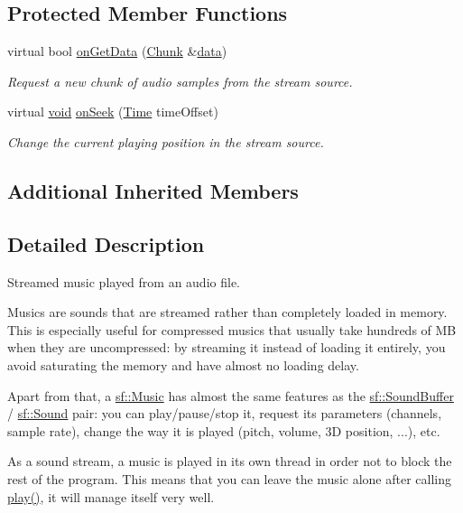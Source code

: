 \subsection*{Protected Member Functions}
\begin{DoxyCompactItemize}
\item 
virtual bool \hyperlink{classsf_1_1_music_aca1bcb4e5d56a854133e74bd86374463}{on\-Get\-Data} (\hyperlink{structsf_1_1_sound_stream_1_1_chunk}{Chunk} \&\hyperlink{gl3_8h_a0f78eecb0891cce3bdfc815b971866a1}{data})
\begin{DoxyCompactList}\small\item\em Request a new chunk of audio samples from the stream source. \end{DoxyCompactList}\item 
virtual \hyperlink{glutf90_8h_ac778d6f63f1aaf8ebda0ce6ac821b56e}{void} \hyperlink{classsf_1_1_music_a15119cc0419c16bb334fa0698699c02e}{on\-Seek} (\hyperlink{classsf_1_1_time}{Time} time\-Offset)
\begin{DoxyCompactList}\small\item\em Change the current playing position in the stream source. \end{DoxyCompactList}\end{DoxyCompactItemize}
\subsection*{Additional Inherited Members}


\subsection{Detailed Description}
Streamed music played from an audio file. 

Musics are sounds that are streamed rather than completely loaded in memory. This is especially useful for compressed musics that usually take hundreds of M\-B when they are uncompressed\-: by streaming it instead of loading it entirely, you avoid saturating the memory and have almost no loading delay.

Apart from that, a \hyperlink{classsf_1_1_music}{sf\-::\-Music} has almost the same features as the \hyperlink{classsf_1_1_sound_buffer}{sf\-::\-Sound\-Buffer} / \hyperlink{classsf_1_1_sound}{sf\-::\-Sound} pair\-: you can play/pause/stop it, request its parameters (channels, sample rate), change the way it is played (pitch, volume, 3\-D position, ...), etc.

As a sound stream, a music is played in its own thread in order not to block the rest of the program. This means that you can leave the music alone after calling \hyperlink{classsf_1_1_sound_stream_afdc08b69cab5f243d9324940a85a1144}{play()}, it will manage itself very well.

